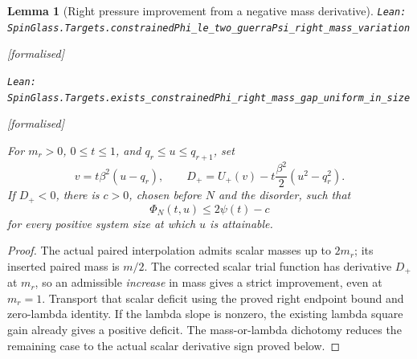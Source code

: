 \documentclass[11pt]{article}
\providecommand{\lean}[1]{\leavevmode\par\nopagebreak
  {\noindent\normalfont\footnotesize\raggedright\texttt{Lean: #1}\par}\nopagebreak}
\providecommand{\leanok}{\par\nopagebreak
  {\noindent\normalfont\footnotesize\textcolor{green!50!black}{[formalised]}\par}\nopagebreak}
\newtheorem{lemma}[theorem]{Lemma}
\begin{document}
\begin{lemma}[Right pressure improvement from a negative mass derivative]
\lean{SpinGlass.Targets.constrainedPhi\_le\_two\_guerraPsi\_right\_mass\_variation}\leanok
\lean{SpinGlass.Targets.exists\_constrainedPhi\_right\_mass\_gap\_uniform\_in\_size}\leanok
For $m_r>0$, $0\le t\le1$, and $q_r\le u\le q_{r+1}$, set
\[
 v=t\beta^2(u-q_r),\qquad
 D_+=U_+(v)-t\frac{\beta^2}{2}(u^2-q_r^2).
\]
If $D_+<0$, there is $c>0$, chosen before $N$ and the disorder, such that
\[
 \Phi_N(t,u)\le2\psi(t)-c
\]
for every positive system size at which $u$ is attainable.
\end{lemma}
\begin{proof}
The actual paired interpolation admits scalar masses up to $2m_r$;
its inserted paired mass is $m/2$. The corrected scalar trial function has
derivative $D_+$ at $m_r$, so an admissible \emph{increase} in mass gives a
strict improvement, even at $m_r=1$. Transport that scalar deficit using the
proved right endpoint bound and zero-lambda identity. If the lambda slope is
nonzero, the existing lambda square gain already gives a positive deficit.
The mass-or-lambda dichotomy reduces the remaining case to the actual scalar
derivative sign proved below.
\end{proof}
\end{document}
